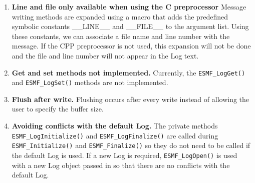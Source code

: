 %

\begin{enumerate}

\item {\bf Line and file only available when using the C preprocessor}
Message writing methods are expanded using a macro that adds the
predefined symbolic constants \_\_LINE\_\_ and \_\_FILE\_\_ to the argument list.
Using these constants, we can associate a file name and line number with the
message.  If the CPP preprocessor is not used, this expansion will not be done
and the file and line number will not appear in the Log text.

\item{\bf Get and set methods not implemented.}
Currently, the {\tt ESMF\_LogGet()} and {\tt ESMF\_LogSet()} methods are 
not implemented.

\item{\bf Flush after write.}
Flushing occurs after every write instead of allowing the user to
specify the buffer size.

\item{\bf Avoiding conflicts with the default Log.}
The private methods {\tt ESMF\_LogInitialize()} and {\tt ESMF\_LogFinalize()} 
are called during {\tt ESMF\_Initialize()} and
{\tt ESMF\_Finalize()} so they do not need to be called if the default 
Log is used.  If a new Log is required, {\tt ESMF\_LogOpen()} is used with a 
new Log object passed in so that there are no conflicts with the default Log.

\end{enumerate}
